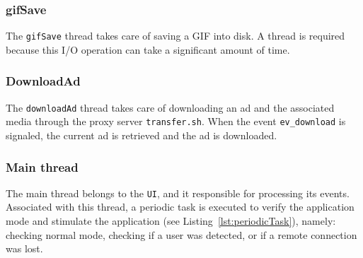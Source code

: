 \subsubsection{gifSave}
\label{sec:gifsave}
The \texttt{gifSave} thread takes care of saving a GIF into disk. A thread is
required because this I/O operation can take a significant amount of time.

\subsubsection{DownloadAd}
\label{sec:downloadad}
The \texttt{downloadAd} thread takes care of downloading an ad and the
associated media through the proxy server \texttt{transfer.sh}. When the event
\texttt{ev\_download} is signaled, the current ad is retrieved and the ad is downloaded.

\subsubsection{Main thread}
\label{sec:main-thread}
The main thread belongs to the \texttt{UI}, and it responsible for processing
its events. Associated with this thread, a periodic task is executed to verify
the application mode and stimulate the application (see
Listing~\ref{lst:periodicTask}), namely: checking normal mode, checking if a
user was detected, or if a remote connection was lost.


